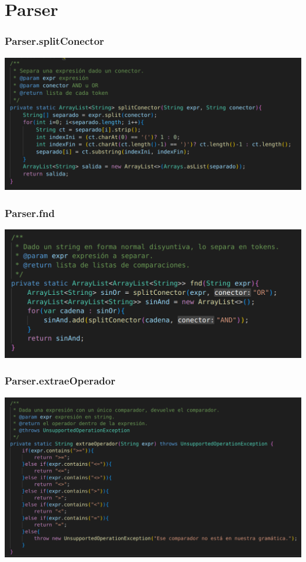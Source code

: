 \documentclass{beamer}
\begin{document}
\section{Parser}

\begin{frame}
\frametitle{Parser.splitConector}
\includegraphics[width=\linewidth]{parser_splitconector}
\end{frame}

\begin{frame}
\frametitle{Parser.fnd}
\includegraphics[width=\linewidth]{parser_fnd}
\end{frame}

\begin{frame}
\frametitle{Parser.extraeOperador}
\includegraphics[width=\linewidth]{parser_extraeoperador}
\end{frame}
\end{document}
